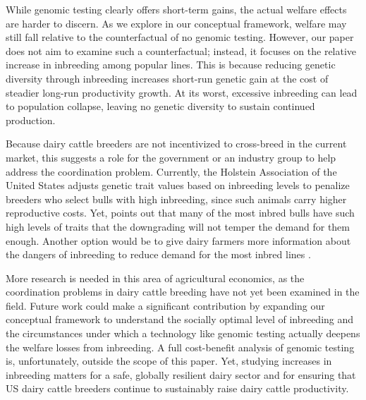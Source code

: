 \documentclass[12pt,letterpaper]{article}
\begin{document}
While genomic testing clearly offers short-term gains, the actual welfare effects are harder to discern. As we explore in our conceptual framework, welfare may still fall relative to the counterfactual of no genomic testing. However, our paper does not aim to examine such a counterfactual; instead, it focuses on the relative increase in inbreeding among popular lines. This is because reducing genetic diversity through inbreeding increases short-run genetic gain at the cost of steadier long-run productivity growth. At its worst, excessive inbreeding can lead to population collapse, leaving no genetic diversity to sustain continued production.

Because dairy cattle breeders are not incentivized to cross-breed in the current market, this suggests a role for the government or an industry group to help address the coordination problem. Currently, the Holstein Association of the United States adjusts genetic trait values based on inbreeding levels to penalize breeders who select bulls with high inbreeding, since such animals carry higher reproductive costs. Yet, \citet{Cole2023} points out that many of the most inbred bulls have such high levels of traits that the downgrading will not temper the demand for them enough. Another option would be to give dairy farmers more information about the dangers of inbreeding to reduce demand for the most inbred lines \citep{Cole2023}.

More research is needed in this area of agricultural economics, as the coordination problems in dairy cattle breeding have not yet been examined in the field. Future work could make a significant contribution by expanding our conceptual framework to understand the socially optimal level of inbreeding and the circumstances under which a technology like genomic testing actually deepens the welfare losses from inbreeding. A full cost-benefit analysis of genomic testing is, unfortunately, outside the scope of this paper. Yet, studying increases in inbreeding matters for a safe, globally resilient dairy sector and for ensuring that US dairy cattle breeders continue to sustainably raise dairy cattle productivity.
\end{document}
